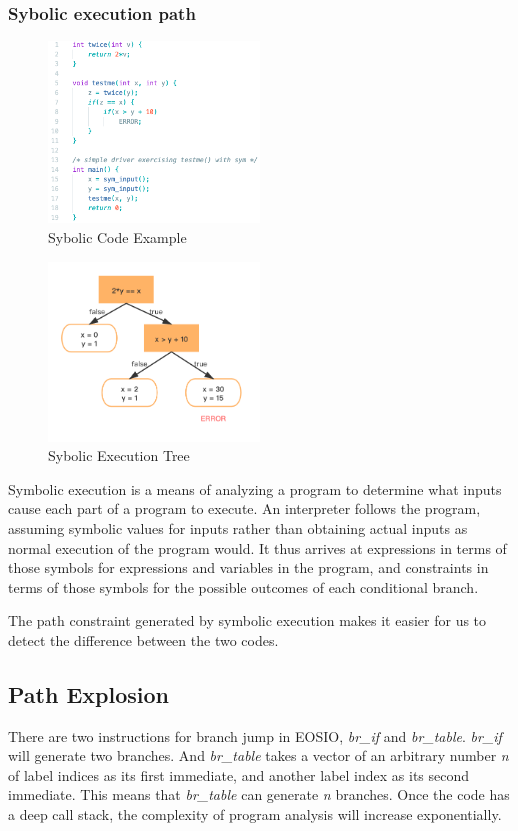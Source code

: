 \documentclass[a4paper, 10pt, conference, twocolumn]{ieeeconf}       %
\begin{document}
\subsubsection{Sybolic execution path}

\begin{figure}[h]
    \centering
    \includegraphics[width=0.5\textwidth]{figures/sym_code.png}
    \caption{Sybolic Code Example}
\end{figure}
\begin{figure}[h]
    \centering
    \includegraphics[width=0.5\textwidth]{figures/sym_graph.jpg}
    \caption{Sybolic Execution Tree}
\end{figure}

Symbolic execution is a means of analyzing a program to determine what inputs cause each part of a program to execute.
An interpreter follows the program,
assuming symbolic values for inputs rather than obtaining actual inputs as normal execution of the program would.
It thus arrives at expressions in terms of those symbols for expressions and variables in the program,
and constraints in terms of those symbols for the possible outcomes of each conditional branch.

The path constraint generated by symbolic execution makes it easier for us to detect the difference between the two codes.

\subsection{Path Explosion}\label{4.2}
There are two instructions for branch jump in EOSIO,
\emph{br\_if} and \emph{br\_table}. \emph{br\_if} will generate two branches.
And \emph{br\_table} takes a vector of an arbitrary number \emph{n} of label indices as its first immediate,
and another label index as its second immediate.
This means that \emph{br\_table} can generate \emph{n} branches.
Once the code has a deep call stack, the complexity of program analysis will increase exponentially.\cite{272292}
\end{document}

